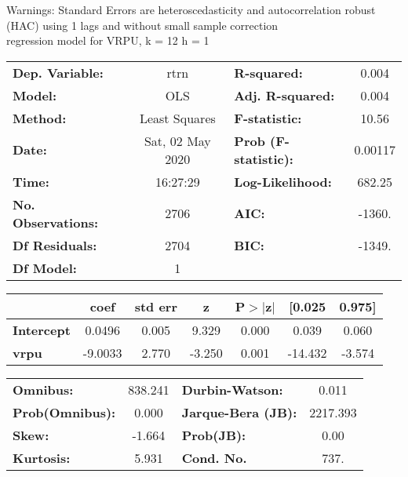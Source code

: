 Warnings: \newline
 [1] Standard Errors are heteroscedasticity and autocorrelation robust (HAC) using 1 lags and without small sample correction\\ 

regression model for VRPU, k = 12 h = 1\begin{center}
\begin{tabular}{lclc}
\toprule
\textbf{Dep. Variable:}    &       rtrn       & \textbf{  R-squared:         } &     0.004   \\
\textbf{Model:}            &       OLS        & \textbf{  Adj. R-squared:    } &     0.004   \\
\textbf{Method:}           &  Least Squares   & \textbf{  F-statistic:       } &     10.56   \\
\textbf{Date:}             & Sat, 02 May 2020 & \textbf{  Prob (F-statistic):} &  0.00117    \\
\textbf{Time:}             &     16:27:29     & \textbf{  Log-Likelihood:    } &    682.25   \\
\textbf{No. Observations:} &        2706      & \textbf{  AIC:               } &    -1360.   \\
\textbf{Df Residuals:}     &        2704      & \textbf{  BIC:               } &    -1349.   \\
\textbf{Df Model:}         &           1      & \textbf{                     } &             \\
\bottomrule
\end{tabular}
\begin{tabular}{lcccccc}
                   & \textbf{coef} & \textbf{std err} & \textbf{z} & \textbf{P$> |$z$|$} & \textbf{[0.025} & \textbf{0.975]}  \\
\midrule
\textbf{Intercept} &       0.0496  &        0.005     &     9.329  &         0.000        &        0.039    &        0.060     \\
\textbf{vrpu}      &      -9.0033  &        2.770     &    -3.250  &         0.001        &      -14.432    &       -3.574     \\
\bottomrule
\end{tabular}
\begin{tabular}{lclc}
\textbf{Omnibus:}       & 838.241 & \textbf{  Durbin-Watson:     } &    0.011  \\
\textbf{Prob(Omnibus):} &   0.000 & \textbf{  Jarque-Bera (JB):  } & 2217.393  \\
\textbf{Skew:}          &  -1.664 & \textbf{  Prob(JB):          } &     0.00  \\
\textbf{Kurtosis:}      &   5.931 & \textbf{  Cond. No.          } &     737.  \\
\bottomrule
\end{tabular}
\end{center}

